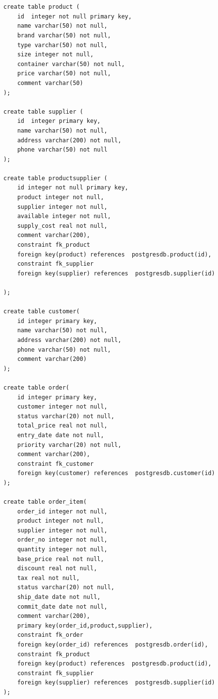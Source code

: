 \documentclass[12pt,oneside]{memoir}
\begin{document}
\begin{lstlisting}[title={setup-postgres-model.sql},captionpos=t]


create table product (
    id  integer not null primary key,
    name varchar(50) not null,
    brand varchar(50) not null,
    type varchar(50) not null,
    size integer not null,
    container varchar(50) not null,
    price varchar(50) not null,
    comment varchar(50)
);

create table supplier (
    id  integer primary key,
    name varchar(50) not null,
    address varchar(200) not null,
    phone varchar(50) not null
);

create table productsupplier (
    id integer not null primary key,
    product integer not null,
    supplier integer not null,
    available integer not null,
    supply_cost real not null,
    comment varchar(200),
    constraint fk_product
    foreign key(product) references  postgresdb.product(id),
    constraint fk_supplier
    foreign key(supplier) references  postgresdb.supplier(id)
    
);

create table customer(
    id integer primary key,
    name varchar(50) not null,
    address varchar(200) not null,
    phone varchar(50) not null,
    comment varchar(200)
);

create table order(
    id integer primary key,
    customer integer not null,
    status varchar(20) not null,
    total_price real not null,
    entry_date date not null,
    priority varchar(20) not null,
    comment varchar(200),
    constraint fk_customer
    foreign key(customer) references  postgresdb.customer(id)
);

create table order_item(
    order_id integer not null,
    product integer not null,
    supplier integer not null, 
    order_no integer not null,
    quantity integer not null,
    base_price real not null,
    discount real not null,
    tax real not null,
    status varchar(20) not null,
    ship_date date not null,
    commit_date date not null,
    comment varchar(200),
    primary key(order_id,product,supplier),
    constraint fk_order
    foreign key(order_id) references  postgresdb.order(id),
    constraint fk_product
    foreign key(product) references  postgresdb.product(id),
    constraint fk_supplier
    foreign key(supplier) references  postgresdb.supplier(id)
);

\end{lstlisting}


\end{document}

